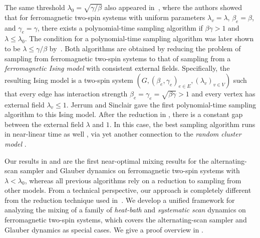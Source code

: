 \documentclass[11pt]{amsart}
\theoremstyle{definition}
\theoremstyle{remark}
\begin{document}
The same threshold $\lambda_0 = \sqrt{\gamma/\beta}$ also appeared in~\cite{GoldbergJP03}, where the authors showed that for ferromagnetic two-spin systems with uniform parameters $\lambda_v = \lambda$, $\beta_e = \beta$, and $\gamma_e = \gamma$, there exists a polynomial-time sampling algorithm if $\beta \gamma > 1$ and $\lambda \leq \lambda_0$. 
The condition for a polynomial-time sampling algorithm was later shown to be $\lambda \leq {\gamma}/{\beta}$ by~\cite{LiuLZ14}.
Both algorithms are obtained by reducing the problem of sampling from ferromagnetic two-spin systems to that of sampling from a \emph{ferromagnetic Ising model} with consistent external fields. Specifically, the resulting Ising model is a two-spin system $(G,(\beta_e,\gamma_e)_{e \in E},(\lambda_v)_{v \in V})$ such that every edge has interaction strength $\beta_e = \gamma_e = \sqrt{\beta \gamma} > 1$ and every vertex has external field $\lambda_v \leq 1$.
Jerrum and Sinclair \cite{JerrumS93} gave the first polynomial-time sampling algorithm to this Ising model.
After the reduction in \cite{LiuLZ14}, there is a constant gap between the external field $\lambda$ and $1$.
In this case, the best sampling algorithm runs in near-linear time as well \cite{CZ23}, via yet another connection \cite{ES88,GuoJ18,FengGW23} to the \emph{random cluster model} \cite{FK72}.

Our results in  and  are the first near-optimal mixing results for the alternating-scan sampler and Glauber dynamics on ferromagnetic two-spin systems with $\lambda < \lambda_0$, whereas all previous algorithms rely on a reduction to sampling from other models. 
From a technical perspective, our approach is completely different from the reduction technique used in~\cite{GoldbergJP03, LiuLZ14}. 
We develop a unified framework for analyzing the mixing of a family of \emph{heat-bath} and \emph{systematic scan} dynamics on ferromagnetic two-spin systems, which covers the alternating-scan sampler and Glauber dynamics as special cases.  
We give a proof overview in .
\end{document}

